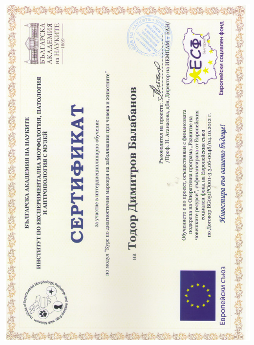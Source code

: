 \documentclass[bulgarian,a4paper]{europasscv}
\begin{document}
\includegraphics[width=\textwidth,height=\textheight,keepaspectratio]{IEMPAM2014_2}
\end{document}
